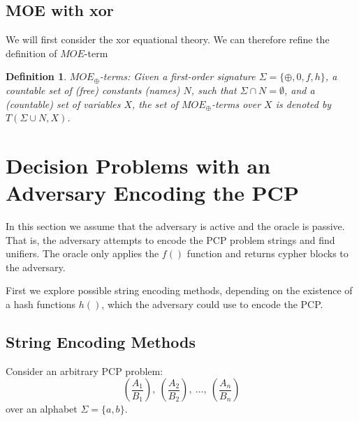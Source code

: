 \documentclass[11pt,twoside,a4paper]{article}
\newtheorem{definition}{Definition}
\newcommand{\ignore}[1]{}
\begin{document}
\subsection{MOE with xor}

We will first consider the xor equational theory. We can therefore refine the definition of $MOE$-term 

\begin{definition}
	$MOE_{\oplus}$-terms: Given a first-order signature $\Sigma=\{
	\oplus, 0, f, h\}$, a countable set of (free) constants (names) $N$, such that $\Sigma \cap N =\emptyset$, and a (countable) set of variables $X$, the set of $MOE_{\oplus}$-terms over $X$ is denoted by $T(\Sigma \cup N,X)$. 
\end{definition}


\section{Decision Problems with an Adversary Encoding the PCP}
In this section we assume that the adversary is active and the 
oracle is passive. That is, the adversary attempts to encode the 
PCP problem strings and find unifiers. The oracle only applies the 
$f()$ function and returns cypher blocks to the adversary. 

First we explore possible string encoding methods, depending on
the existence of a hash functions $h()$, which the adversary 
could use to encode the PCP.

\subsection{String Encoding Methods}\label{sec:encoding}
Consider an arbitrary PCP problem:
\[
(\frac{A_1}{B_1}),~(\frac{A_2}{B_2}), ~\ldots, ~(\frac{A_n}{B_n})
\]
over an alphabet $\Sigma=\{a, b\}$. 
\ignore{
	We encode a string a string $A_i = a_1 a_2 a_3 a_4$ by 
	setting each character of the string as a plaintext block 
	and sending each to the oracle from left to right, one at a 
	time. For example,  $A_i = a_1 a_2 a_3 a_4$:
	\begin{align*}
	p_1 &=a_1\\
	c_1 &=f(a_1 \oplus IV)\\
	p_2 &=a_2\\
	c_2 &=f(a_2 \oplus c_1)\\
	&\ldots\\
	c_4 &=f(a_4 \oplus c_3)
	\end{align*}
}
\end{document}
